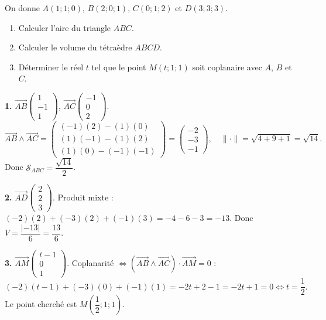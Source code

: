 \documentclass[11pt]{article}
\begin{document}
\begin{exercice}
On donne $A(1;1;0)$, $B(2;0;1)$, $C(0;1;2)$ et $D(3;3;3)$.
\begin{enumerate}
\item Calculer l'aire du triangle $ABC$.
\item Calculer le volume du tétraèdre $ABCD$.
\item Déterminer le réel $t$ tel que le point $M(t ; 1 ; 1)$ soit coplanaire avec $A$, $B$ et $C$.
\end{enumerate}
\end{exercice}

\begin{corrige}[Exercice]
\textbf{1.} $\overrightarrow{AB}\begin{pmatrix} 1 \\ -1 \\ 1 \end{pmatrix}$, $\overrightarrow{AC}\begin{pmatrix} -1 \\ 0 \\ 2 \end{pmatrix}$.
\[ \overrightarrow{AB} \wedge \overrightarrow{AC} = \begin{pmatrix} (-1)(2) - (1)(0) \\ (1)(-1) - (1)(2) \\ (1)(0) - (-1)(-1) \end{pmatrix} = \begin{pmatrix} -2 \\ -3 \\ -1 \end{pmatrix}, \quad \|\cdot\| = \sqrt{4+9+1} = \sqrt{14}. \]
Donc $\mathcal{S}_{ABC} = \dfrac{\sqrt{14}}{2}$.

\textbf{2.} $\overrightarrow{AD}\begin{pmatrix} 2 \\ 2 \\ 3 \end{pmatrix}$. Produit mixte : $(-2)(2) + (-3)(2) + (-1)(3) = -4 - 6 - 3 = -13$. Donc $V = \dfrac{|-13|}{6} = \dfrac{13}{6}$.

\textbf{3.} $\overrightarrow{AM}\begin{pmatrix} t-1 \\ 0 \\ 1 \end{pmatrix}$. Coplanarité $\iff (\overrightarrow{AB}\wedge\overrightarrow{AC})\cdot\overrightarrow{AM} = 0$ :
\[ (-2)(t-1) + (-3)(0) + (-1)(1) = -2t + 2 - 1 = -2t + 1 = 0 \iff t = \frac{1}{2}. \]
Le point cherché est $M\left(\dfrac{1}{2} ; 1 ; 1\right)$.
\end{corrige}
\end{document}

